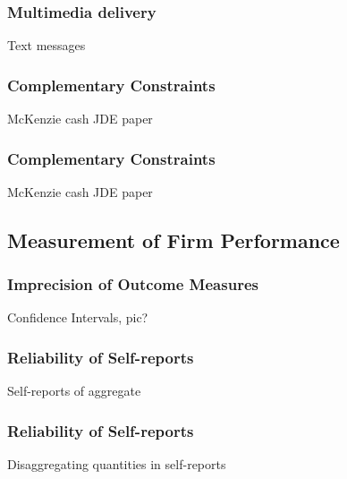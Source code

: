 \documentclass[hideothersubsections, usenames,dvipsnames,10pt]{beamer}
\newenvironment{itemize_3pt}{\itemize\addtolength{\itemsep}{3pt}}{\enditemize}
\begin{document}
\begin{frame}
\frametitle{Multimedia delivery}
	Text messages
	\begin{itemize_3pt}
	\item \citep{Cole2019} \citep{Acimovic2020}
	\vspace{0.1in}
	\end{itemize_3pt}
\end{frame}


\begin{frame}
\frametitle{Complementary Constraints}
	\begin{itemize_3pt}
	\item McKenzie cash JDE paper
	\vspace{0.1in}
	\end{itemize_3pt}
\end{frame}

\begin{frame}
\frametitle{Complementary Constraints}
	\begin{itemize_3pt}
	\item McKenzie cash JDE paper
	\vspace{0.1in}
	\end{itemize_3pt}
\end{frame}


\subsection{Measurement of Firm Performance}

\begin{frame}
\frametitle{Imprecision of Outcome Measures}
	\begin{itemize_3pt}
	\item Confidence Intervals, pic?
	\vspace{0.1in}
	\end{itemize_3pt}
\end{frame}

\begin{frame}
\frametitle{Reliability of Self-reports}
	\begin{itemize_3pt}
	\item Self-reports of aggregate \citep{deMel2009}
	\vspace{0.1in}
	\end{itemize_3pt}
\end{frame}

\begin{frame}
\frametitle{Reliability of Self-reports}
	\begin{itemize_3pt}
	\item Disaggregating quantities in self-reports \citep{deMel2009}
	\vspace{0.1in}
	\end{itemize_3pt}
\end{frame}
\end{document}
